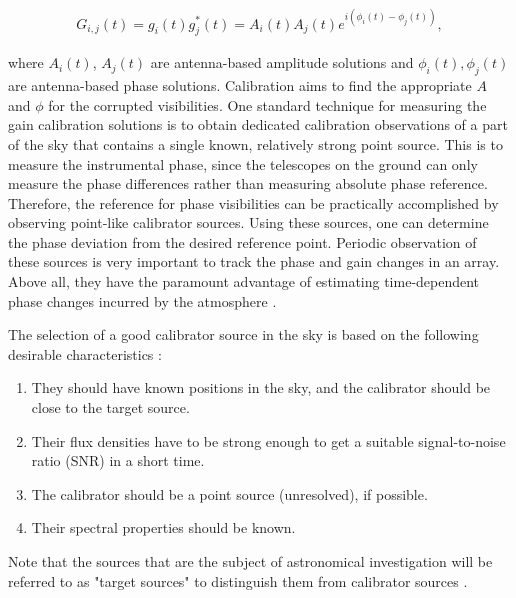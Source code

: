 \begin{align}
G_{i,j}(t)= g_i(t)g^*_j(t) = A_{i}(t)A_{j}(t) e ^{i\left(\phi_i(t)-\phi_j(t)\right)},
\label{Sols}
\end{align}

where  $A_{i}(t)$, $A_{j}(t)$ are antenna-based amplitude solutions and $\phi_i(t),\phi_j(t)$ are antenna-based phase solutions. Calibration aims to find the appropriate $A$ and $\phi$ for the corrupted visibilities. One standard technique for measuring the gain calibration solutions is to obtain dedicated calibration observations of a part of the sky that contains a single known, relatively strong point source. This is to measure the instrumental phase, since the telescopes on the ground can only measure the phase differences rather than measuring absolute phase reference. Therefore, the reference for phase visibilities can be practically accomplished by observing point-like calibrator sources. Using these sources, one can determine the phase deviation from the desired reference point. Periodic observation of these sources is very important  to track the phase and gain changes in an array. Above all, they have the paramount advantage of estimating time-dependent phase changes incurred by the atmosphere \citep{taylor1999synthesis}.

The selection of a good calibrator source in the sky is based on the following desirable characteristics \citep{thompson2001interferometry}: 

\begin{enumerate}
\item They should have known positions in the sky, and the calibrator should be close to the target source. 
\item  Their flux densities have to be strong enough to get a suitable signal-to-noise ratio (SNR) in a short time.
 \item The calibrator should be a point source (unresolved), if possible. 
 \item Their spectral properties should be known.
 \end{enumerate}
 
 Note that the sources that are the subject of astronomical investigation will be referred to as "target sources" to distinguish them from calibrator sources \citep{thompson2001interferometry}.
 
